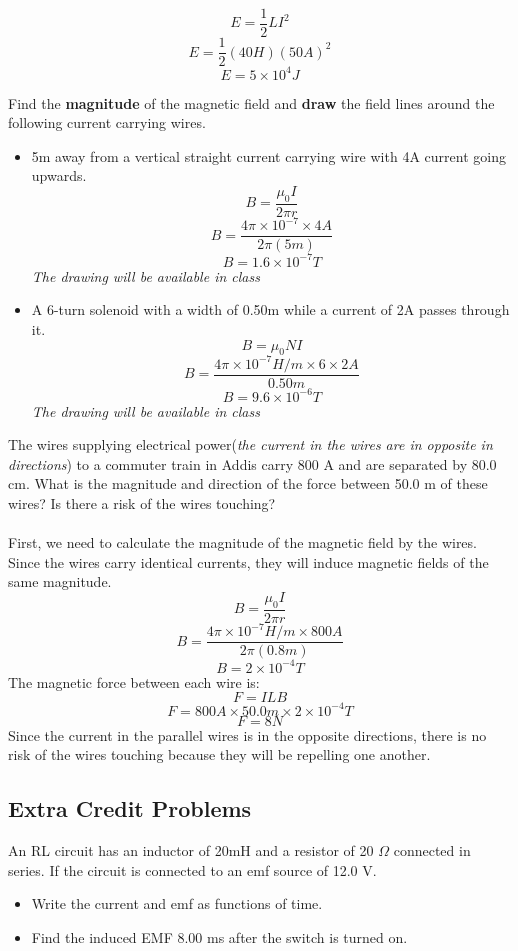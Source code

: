 \documentclass[12pt,addpoints]{exam}
\begin{document}
{{{\begin{questions}
\begin{itemize}
						$$E=\dfrac{1}{2}LI^2$$
						$$E=\dfrac{1}{2}(40H)(50A)^2$$
						$$E=5\times10^4J$$
					\end{itemize}
					\question Find the \textbf{magnitude} of the magnetic field and \textbf{draw} the field lines around the following current carrying wires.
					\begin{itemize}
						\item 5m away from a vertical straight current carrying wire with 4A current going upwards.
						$$B=\dfrac{\mu_0I}{2\pi r}$$
						$$B=\dfrac{4\pi\times10^{-7}\times4A}{2\pi(5m)}$$
						$$B=1.6\times10^{-7}T$$
						\textit{The drawing will be available in class}
						\item A 6-turn solenoid with a width of 0.50m while a current of 2A passes through it.
						$$B=\mu_0 N I$$
						$$B=\dfrac{4\pi\times10^{-7}H/m\times6\times2A}{0.50m}$$
						$$B=9.6\times10^{-6}T$$
						\textit{The drawing will be available in class}
					\end{itemize}
					\question The wires supplying electrical power(\textit{the current in the wires are in opposite in directions}) to a commuter train in Addis carry 800 A and are separated by 80.0 cm. What is the magnitude and direction of the force between 50.0 m of these wires? Is there a risk of the wires touching? \\ \\
					First, we need to calculate the magnitude of the magnetic field by the wires. Since the wires carry identical currents, they will induce magnetic fields of the same magnitude.
					$$B=\dfrac{\mu_0 I}{2\pi r}$$
					$$B=\dfrac{4\pi\times10^{-7}H/m\times800A}{2\pi(0.8m)}$$
					$$B=2\times10^{-4}T$$
					The magnetic force between each wire is:
					$$F=ILB$$
					$$F=800A\times50.0m\times2\times10^{-4}T$$
					$$F=8N$$
					Since the current in the parallel wires is in the opposite directions, there is no risk of the wires touching because they will be repelling one another.
					\subsection*{Extra Credit Problems}
					\question An RL circuit has an inductor of 20mH and a resistor of 20 $\Omega$ connected in series. If the circuit is connected to an emf source of 12.0 V. 
					\begin{itemize}
						\item Write the current and emf as functions of time.\vspace{0.7in}
						\item Find the induced EMF 8.00 ms after the switch is turned on.\vspace{1in}	
					\end{itemize}
				\end{questions}
				\begin{center}

\end{center}}}}
\end{document}
